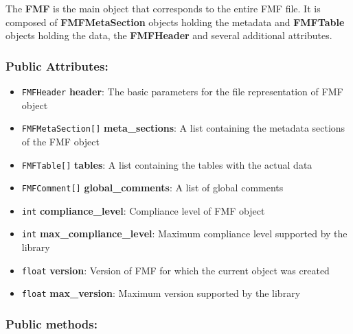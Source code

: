 \documentclass[10pt,utf8, mainlanguage=english]{ufcd-info}
\newcommand{\fret}[1]{{\texttt{#1}}}
\newcommand{\fmfattr}[1]{{\textbf{#1}}}
\newcommand{\fmfobj}[1]{{\textbf{\textsf{#1}}}}
\begin{document}
The \fmfobj{FMF} is the main object that corresponds to the entire FMF file. It is composed of \fmfobj{FMFMetaSection} objects holding the metadata and \fmfobj{FMFTable} objects holding the data, the \fmfobj{FMFHeader} and several additional attributes.

\subsubsection{Public Attributes:}
\begin{itemize}
	\item \fret{FMFHeader} \fmfattr{header}: The basic parameters for the file representation of FMF object
	\item \fret{FMFMetaSection[]} \fmfattr{meta\_sections}: A list containing the metadata sections of the FMF object
	\item \fret{FMFTable[]} \fmfattr{tables}: A list containing the tables with the actual data
	\item \fret{FMFComment[]} \fmfattr{global\_comments}: A list of global comments
	\item \fret{int} \fmfattr{compliance\_level}: Compliance level of FMF object
	\item \fret{int} \fmfattr{max\_compliance\_level}: Maximum compliance level supported by the library
	\item \fret{float} \fmfattr{version}: Version of FMF for which the current object was created
	\item \fret{float} \fmfattr{max\_version}: Maximum version supported by the library
\end{itemize}

\subsubsection{Public methods:}
\end{document}
